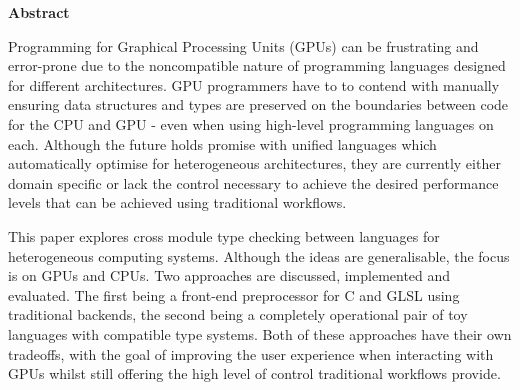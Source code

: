 \newpage
{\Huge \bf Abstract}
\vspace{24pt}



Programming for Graphical Processing Units (GPUs) can be frustrating and
error-prone due to the noncompatible nature of programming languages designed
for different architectures. GPU programmers have to to contend with manually
ensuring data structures and types are preserved on the boundaries between code
for the CPU and GPU - even when using high-level programming languages on each.
Although the future holds promise with unified languages which automatically
optimise for heterogeneous architectures, they are currently either domain
specific or lack the control necessary to achieve the desired performance
levels that can be achieved using traditional workflows.

This paper explores cross module type checking between languages for
heterogeneous computing systems. Although the ideas are generalisable, the
focus is on GPUs and CPUs. Two approaches are discussed, implemented and
evaluated. The first being a front-end preprocessor for C and GLSL using
traditional backends, the second being a completely operational pair of toy
languages with compatible type systems. Both of these approaches have their own
tradeoffs, with the goal of improving the user experience when interacting with
GPUs whilst still offering the high level of control traditional workflows
provide.

\newpage
\vspace*{\fill}
